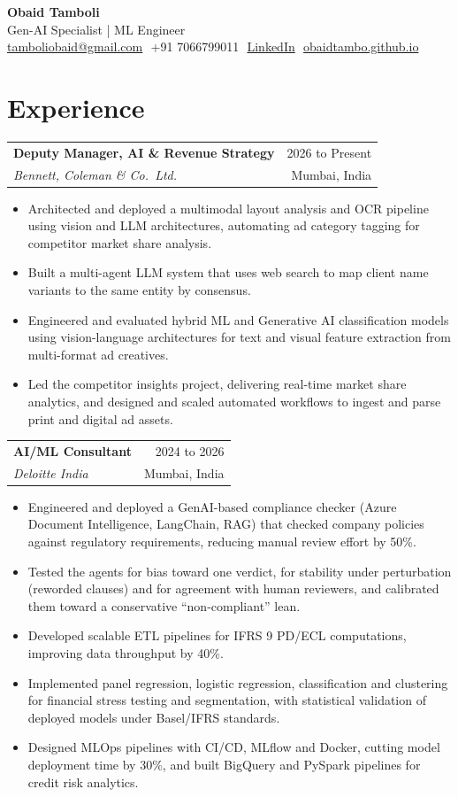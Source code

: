 \documentclass[11pt,a4paper]{article}
\makeatletter
\newcommand{\sep}{\,{\color{soft}\textperiodcentered}\,\allowbreak}
\newcommand{\entry}[4]{%
  \begin{tabularx}{\linewidth}{@{}X r@{}}
    \textbf{#1} & {\color{soft}#2}\\
    \textit{#3} & {\color{soft}\small #4}
  \end{tabularx}\par}
\newcommand{\gap}{\vspace{0.5em}}
\makeatother
\begin{document}
\color{ink}

\begin{center}
  {\LARGE\bfseries Obaid Tamboli}\\[3pt]
  {\small Gen-AI Specialist | ML Engineer}\\[3pt]
  {\small\color{soft}\href{mailto:tamboliobaid@gmail.com}{tamboliobaid@gmail.com}\sep
  +91 7066799011\sep
  \href{https://www.linkedin.com/in/obaidtamboli/}{LinkedIn}\sep
  \href{https://obaidtambo.github.io/}{obaidtambo.github.io}}
\end{center}

\section{Experience}
\entry{Deputy Manager, AI \& Revenue Strategy}{2026 to Present}{Bennett, Coleman \& Co.\ Ltd.}{Mumbai, India}
\begin{itemize}
  \item Architected and deployed a multimodal layout analysis and OCR pipeline using vision and LLM architectures, automating ad category tagging for competitor market share analysis.
  \item Built a multi-agent LLM system that uses web search to map client name variants to the same entity by consensus.
  \item Engineered and evaluated hybrid ML and Generative AI classification models using vision-language architectures for text and visual feature extraction from multi-format ad creatives.
  \item Led the competitor insights project, delivering real-time market share analytics, and designed and scaled automated workflows to ingest and parse print and digital ad assets.
\end{itemize}
\gap
\entry{AI/ML Consultant}{2024 to 2026}{Deloitte India}{Mumbai, India}
\begin{itemize}
  \item Engineered and deployed a GenAI-based compliance checker (Azure Document Intelligence, LangChain, RAG) that checked company policies against regulatory requirements, reducing manual review effort by 50\%.
  \item Tested the agents for bias toward one verdict, for stability under perturbation (reworded clauses) and for agreement with human reviewers, and calibrated them toward a conservative ``non-compliant'' lean.
  \item Developed scalable ETL pipelines for IFRS 9 PD/ECL computations, improving data throughput by 40\%.
  \item Implemented panel regression, logistic regression, classification and clustering for financial stress testing and segmentation, with statistical validation of deployed models under Basel/IFRS standards.
  \item Designed MLOps pipelines with CI/CD, MLflow and Docker, cutting model deployment time by 30\%, and built BigQuery and PySpark pipelines for credit risk analytics.
\end{itemize}
\end{document}
